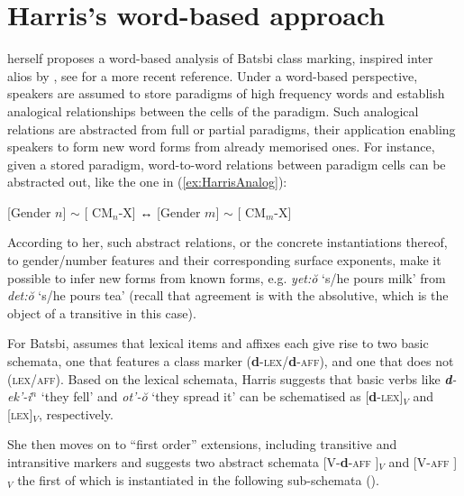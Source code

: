 \documentclass[output=paper]{langsci/langscibook}
\begin{document}
\section{Harris's word-based approach}
\citet{Harris09} herself proposes a word-based analysis of Batsbi
class marking, inspired inter alios by \citet{Blevins06}, see
\citet{Blevins14} for a more recent reference.  Under a word-based
perspective, speakers are assumed to store paradigms of high frequency
words and establish analogical relationships between the cells of the
paradigm. Such analogical relations are abstracted from full or
partial paradigms, their application enabling speakers to form new
word forms from already memorised ones. For instance, given a stored
paradigm, word-to-word relations between paradigm cells can be
abstracted out, like the one in (\ref{ex:HarrisAnalog}):

\begin{exe}
  \ex \label{ex:HarrisAnalog} {[Gender $n$] $\sim$ [ CM$_n$-X] ↔ [Gender $m$] $\sim$ [ CM$_m$-X]}
\end{exe}\largerpage

According to her, such abstract relations, or the concrete
instantiations thereof, to gender/number features and their
corresponding surface exponents, make it possible to infer new forms
from known forms, e.g. \textit{yet:ŏ} `s/he pours milk' from
\textit{det:ŏ} `s/he pours tea' (recall that agreement is with
the absolutive, which is the object of a transitive in this case).

For Batsbi, \citet{Harris09} assumes that lexical items and affixes
each give rise to two basic schemata, one that features a class marker
(\textbf{d}-\textsc{lex}/\textbf{d}-\textsc{aff}), and one that does
not (\textsc{lex}/\textsc{aff}). Based on the lexical schemata, Harris
suggests that basic verbs like \textit{\textbf{d}-ek’-i$^n$} ‘they
fell' and \textit{ot’-ŏ} `they spread it' can be schematised as
[\textbf{d}-\textsc{lex}]$_V$ and [\textsc{lex}]$_V$,
respectively. 

She then moves on to ``first order'' extensions, including transitive
and intransitive markers and suggests two abstract schemata
[V-\textbf{d}-\textsc{aff} ]$_V$ and [V-\textsc{aff} ]$_V$ the first
of which is instantiated in the following sub-schemata ().  
\end{document}
